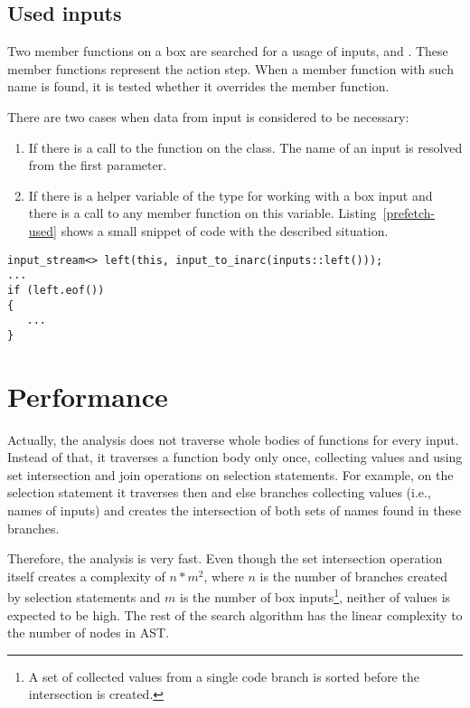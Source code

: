 \subsection{Used inputs}
\label{prefetch-used-inputs}
Two member functions on a box are searched for a usage of inputs,  and . These member functions represent the action step. When a member function with such name is found, it is tested whether it overrides the  member function.

There are two cases when data from input is considered to be necessary:

\begin{enumerate}
\item If there is a call to the  function on the  class. The name of an input is resolved from the first parameter.
\item If there is a helper variable of the type  for working with a box input and there is a call to any member function on this variable. Listing~\ref{prefetch-used} shows a small snippet of code with the described situation.
\end{enumerate}

\begin{lstlisting}[caption={An example of a \textit{used} input.}, label={prefetch-used}]
input_stream<> left(this, input_to_inarc(inputs::left()));
...
if (left.eof())
{
   ...
}
\end{lstlisting}

\section{Performance}
Actually, the analysis does not traverse whole bodies of functions for every input. Instead of that, it traverses a function body only once, collecting values and using set intersection and join operations on selection statements. For example, on the  selection statement it traverses then and else branches collecting values (i.e., names of inputs) and creates the intersection of both sets of names found in these branches.

Therefore, the analysis is very fast. Even though the set intersection operation itself creates a complexity of $n*m^2$, where $n$ is the number of branches created by selection statements and $m$ is the number of box inputs\footnote{A set of collected values from a single code branch is sorted before the intersection is created.}, neither of values is expected to be high. The rest of the search algorithm has the linear complexity to the number of nodes in AST.

